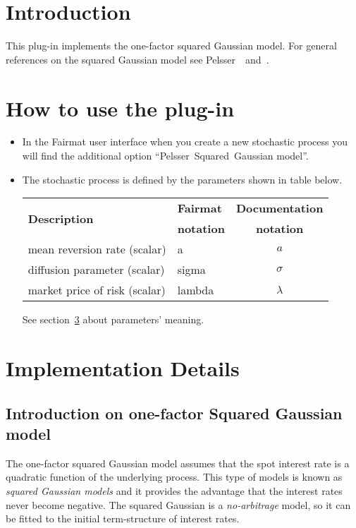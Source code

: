 \newcommand{\pluginName}{Pelsser Model}
\newcommand{\pluginVersion}{1.0.11}


\usepackage{comment}


\PluginTitle{\pluginName}{\pluginVersion}

\section{Introduction}
This plug-in implements the one-factor squared Gaussian model. For general references on the squared Gaussian model see Pelsser~\cite{BookPelsser}~and~\cite{ArtPelsser}.
\section{How to use the plug-in}
\begin{itemize}
  \item In the Fairmat user interface when you create a new stochastic process you will find the additional option ``Pelsser~Squared~Gaussian model''.
  \item The stochastic process is defined by the parameters shown in table below.

\begin{center}
\begin{tabular}{|l|l|c|}
  \hline
 \multirow{2}{*}{\textbf{Description}}& \textbf{Fairmat}&\textbf{Documentation}\\
                     & \textbf{notation}&\textbf{notation}\\
                     \hline
 mean reversion rate    (scalar)        & a        & $a$\\
 diffusion parameter    (scalar)        & sigma  & $\sigma$\\
 market price of risk      (scalar)        & lambda & $\lambda$\\
   \hline
\end{tabular}
\end{center}
See section~\ref{id} about parameters' meaning.
\end{itemize}

\section{Implementation Details}
\label{id}

\subsection{Introduction on one-factor Squared Gaussian model}
The one-factor squared Gaussian model assumes that the spot interest rate is a quadratic function of the underlying process. This type of models is known as \emph{squared Gaussian models} and it provides the advantage that the interest rates never become negative. The squared Gaussian is a \emph{no-arbitrage} model, so it can be fitted to the initial term-structure of interest rates.

